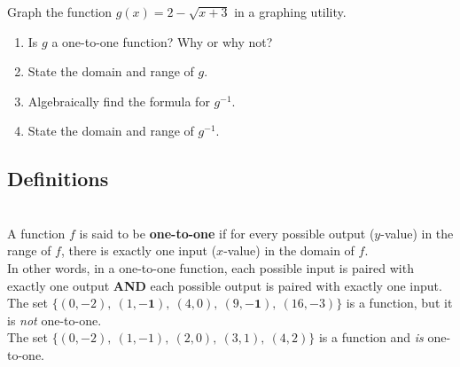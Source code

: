 \begin{myPractice}
Graph the function $g(x) = 2-\sqrt{x+3}$ in a graphing utility.
\begin{enumerate}
	\item Is $g$ a one-to-one function? Why or why not? 
	\vfill
	\vfill

	\item State the domain and range of $g$.
	\vfill

	\item Algebraically find the formula for $g^{-1}$.
	\vfill
	\vfill
	\vfill
	
	\item State the domain and range of $g^{-1}$.
	\vfill

\end{enumerate}
\end{myPractice}



\newpage

\subsection*{Definitions} \label{def-functions-inverse}

\begin{myDefinition}~\\[0.5mm]
A function $f$ is said to be {\bf one-to-one} if for every possible output ($y$-value) in the range of $f$, there is exactly one input ($x$-value) in the domain of $f$. \\

In other words, in a one-to-one function, each possible input is paired with exactly one output {\bf AND} each possible output is paired with exactly one input.\\[0.5em]
 The set $\{ (0,-2), ~ (1, \boldsymbol{-1}), ~ (4, 0), ~ (9,\boldsymbol{-1}),~ (16,-3) \}$ is a function, but it is \textit{not} one-to-one.\\
 The set $\{ (0,-2), ~ (1, -1), ~ (2, 0), ~ (3, 1),~ (4,2) \}$ is a function and \textit{is} one-to-one.
\end{myDefinition}

